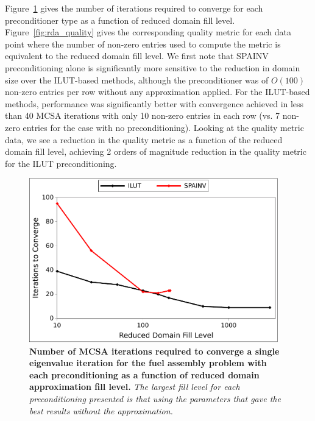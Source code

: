 Figure~\ref{fig:rda_iterations} gives the number of iterations
required to converge for each preconditioner type as a function of
reduced domain fill level. Figure~\ref{fig:rda_quality} gives the
corresponding quality metric for each data point where the number of
non-zero entries used to compute the metric is equivalent to the
reduced domain fill level. We first note that SPAINV preconditioning
alone is significantly more sensitive to the reduction in domain size
over the ILUT-based methods, although the preconditioner was of
$O(100)$ non-zero entries per row without any approximation
applied. For the ILUT-based methods, performance was significantly
better with convergence achieved in less than 40 MCSA iterations with
only 10 non-zero entries in each row (vs. 7 non-zero entries for the
case with no preconditioning). Looking at the quality metric data, we
see a reduction in the quality metric as a function of the reduced
domain fill level, achieving 2 orders of magnitude reduction in the
quality metric for the ILUT preconditioning.

\begin{figure}[t!]
  \begin{center}
    \includegraphics[width=4.25in]{chapters/spn_equations/rda_iterations.pdf}
  \end{center}
  \caption{\textbf{Number of MCSA iterations required to converge a
      single eigenvalue iteration for the fuel assembly problem with
      each preconditioning as a function of reduced domain
      approximation fill level.} \textit{The largest fill level for
      each preconditioning presented is that using the parameters that
      gave the best results without the approximation.}}
  \label{fig:rda_iterations}
\end{figure}

